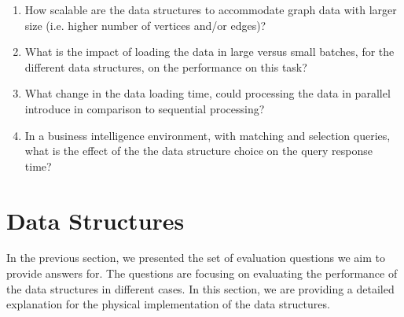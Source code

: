 {\begin{enumerate}
\item How scalable are the data structures to accommodate graph data with larger size (i.e. higher number of vertices and/or edges)?
\item What is the impact of loading the data in large versus small batches, for the different data structures, on the performance on this task?
\item What change in the data loading time, could processing the data in parallel introduce in comparison to sequential processing?
\item In a business intelligence environment, with matching and selection queries, what is the effect of the the data structure choice on the query response time?%

\end{enumerate}

\section{Data Structures}
\label{dataStructs}

In the previous section, we presented the set of evaluation questions we aim to provide answers for. The questions are focusing on evaluating the performance of the data structures in different cases. In this section, we are providing a detailed explanation for the physical implementation of the data structures.

}
